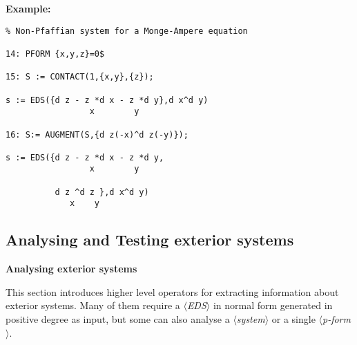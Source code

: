 \documentclass[11pt,letterpaper]{book}
\newcommand{\meta}[1]{\mbox{$\langle$\it#1\/$\rangle$}}
\begin{document}
{\bf Example:}
{\small\begin{verbatim}
% Non-Pfaffian system for a Monge-Ampere equation

14: PFORM {x,y,z}=0$

15: S := CONTACT(1,{x,y},{z});

s := EDS({d z - z *d x - z *d y},d x^d y)
                 x        y

16: S:= AUGMENT(S,{d z(-x)^d z(-y)});

s := EDS({d z - z *d x - z *d y,
                 x        y

          d z ^d z },d x^d y)
             x    y
\end{verbatim}}


\subsection{Analysing and Testing exterior systems}

{\bf Analysing exterior systems} \par
This section introduces higher level operators for extracting information about
exterior systems. Many of them require a \meta{EDS} in normal form generated
in positive degree as input, but some can also analyse a \meta{system} or a
single \meta{p-form}. \\
\end{document}
